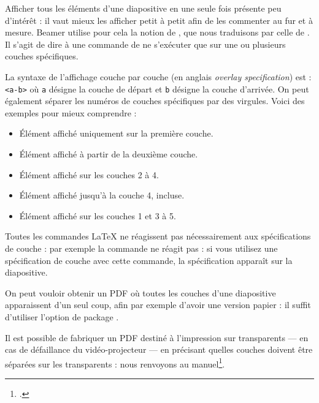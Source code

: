Afficher tous les éléments d'une diapositive en une seule fois présente peu d'intérêt : il vaut mieux les afficher petit à petit afin de les commenter au fur et à mesure. Beamer utilise pour cela la notion de , que nous traduisons par celle de . Il s'agit de dire à une commande de ne s'exécuter que sur une ou plusieurs couches spécifiques.

La syntaxe de l'affichage couche par couche (en anglais \textenglish{\emph{overlay specification}}) est  : \verb|<a-b>| où \verb|a| désigne la couche de départ et \verb|b| désigne la couche d'arrivée. On peut également séparer les numéros de couches spécifiques par des virgules. Voici des exemples pour mieux comprendre :

\begin{latexcode}
\begin{frame}
\begin{itemize}
    \item<1>Élément affiché uniquement sur la première couche.
    \item<2->Élément affiché à partir de la deuxième couche.
    \item<2-4>Élément affiché sur les couches 2 à 4.
    \item<-4>Élément affiché jusqu'à la couche 4, incluse.
    \item<1,3-5>Élément affiché sur les couches 1 et 3 à 5.
\end{itemize}
\end{frame}
\end{latexcode}

Toutes les commandes \LaTeX{} ne réagissent pas nécessairement aux spécifications de couche : par exemple la commande  ne réagit pas : si vous utilisez une spécification de couche avec cette commande, la spécification apparaît sur la diapositive.

On peut vouloir obtenir un PDF où toutes les couches d'une diapositive apparaissent d'un seul coup, afin par exemple d'avoir une version papier : il suffit d'utiliser l'option de package .


\begin{plusloins}
Il est possible de fabriquer un PDF destiné à l'impression sur transparents --- en cas de défaillance du vidéo-projecteur --- en précisant quelles couches doivent être séparées sur les transparents : nous renvoyons au manuel\footcite{beamer_trans}.
\end{plusloins}

